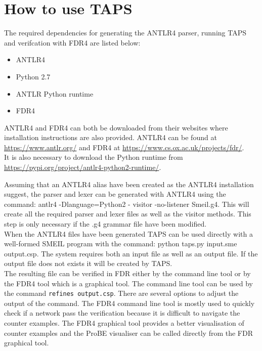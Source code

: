 


\newpage
\section{How to use TAPS}
The required dependencies for generating the ANTLR4 parser, running TAPS and verifcation with FDR4 are listed below:
\begin{itemize}
    \item ANTLR4
    \item Python 2.7
    \item ANTLR Python runtime
    \item FDR4
\end{itemize}

ANTLR4 and FDR4 can both be downloaded from their websites where installation instructions are also provided.
ANTLR4 can be found at \url{https://www.antlr.org/} and FDR4 at \url{https://www.cs.ox.ac.uk/projects/fdr/}.\\
It is also necessary to download the Python runtime from \url{https://pypi.org/project/antlr4-python2-runtime/}.

Assuming that an ANTLR4 alias have been created as the ANTLR4 installation suggest, the parser and lexer can be generated with ANTLR4 using the command: {\ttfamily antlr4 -Dlanguage=Python2 - visitor -no-listener Smeil.g4.}
This will create all the required parser and lexer files as well as the visitor methods. This step is only necessary if the .g4 grammar file have been modified.\\

When the ANTLR4 files have been generated TAPS can be used directly with a well-formed SMEIL program with the command: {\ttfamily python taps.py input.sme output.csp}. The system requires both an input file as well as an output file. If the output file does not exists it will be created by TAPS. \\

The resulting \cspm{} file can be verified in FDR either by the command line tool or by the FDR4 tool which is a graphical tool. The command line tool can be used by the command \texttt{refines output.csp}. There are several options to adjust the output of the command. The FDR4 command line tool is mostly used to quickly check if a network pass the verification because it is difficult to navigate the counter examples. The FDR4 graphical tool provides a better visualisation of counter examples and the ProBE visualiser can be called directly from the FDR graphical tool.

